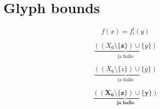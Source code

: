\documentclass[class=scrartcl,crop=false]{standalone}
\newcommand{\set}[1]{\{#1\}}
\begin{document}
\section{Glyph bounds}

\[
    f(x) = f^i_i (y)
\]


\[
    \underbrace{ ((X_6\setminus \set{\mathbf{z}})\cup\set{y})}_{\text{ ja hallo }}
\]

\[
    \underbrace{ ((X_6\setminus \set{z})\cup\set{y})}_{\text{ ja hallo }}
\]

\[
    \boldsymbol{\underbrace{ ((X_6\setminus \set{z})\cup\set{y})}_{\text{ ja hallo }}}
\]
\end{document}
